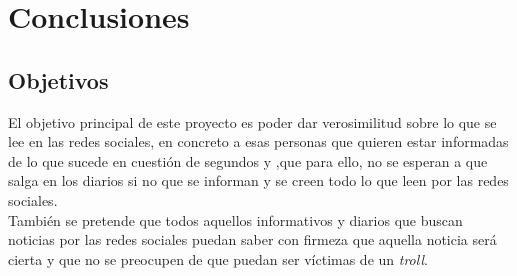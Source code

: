 \documentclass[../all.tex]{subfiles}
\begin{document}
\section{Conclusiones} 

\subsection{Objetivos} %
El objetivo principal de este proyecto es poder dar verosimilitud sobre lo que se lee en las redes sociales, en concreto a esas personas que quieren estar informadas de lo que sucede en cuestión de segundos y ,que para ello, no se esperan a que salga en los diarios si no que se informan y se creen todo lo que leen por las redes sociales.\\
También se pretende que todos aquellos informativos y diarios que buscan noticias por las redes sociales puedan saber con firmeza que aquella noticia será cierta y que no se preocupen de que puedan ser víctimas de un \textit{troll}. 
\end{document}
